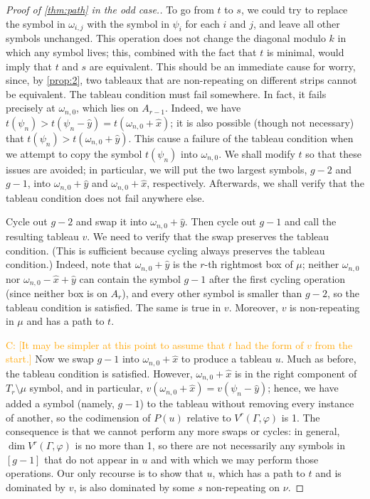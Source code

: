 \documentclass[11pt,reqno]{amsart}
\newcommand{\caelan}[1]{\textcolor{orange}{\sf C: [#1]}}
\theoremstyle{definition}
\theoremstyle{problem}
\theoremstyle{plain}
\theoremstyle{remark}
\theoremstyle{theorem}
\numberwithin{equation}{section}
\numberwithin{figure}{section}
\begin{document}
\begin{proof}[Proof of \cref{thm:path} in the odd case.]
  To go from $t$ to $s$, we could try to replace the symbol in
  $\omega_{i,j}$ with the symbol in $\psi_i$ for each $i$ and $j$, and
  leave all other symbols unchanged.  This operation does not change
  the diagonal modulo $k$ in which any symbol lives; this, combined
  with the fact that $t$ is minimal, would imply that $t$ and $s$ are
  equivalent.  This should be an immediate cause for worry, since, by
  \cref{prop:2}, two tableaux that are non-repeating on different
  strips cannot be equivalent.  The tableau condition must fail
  somewhere.  In fact, it fails precisely at $\omega_{n,0}$, which
  lies on $A_{r-1}$.  Indeed, we have
  $t(\psi_n) > t(\psi_n - \hat y) = t(\omega_{n,0}+ \hat x)$; it is
  also possible (though not necessary) that
  $t(\psi_n) > t(\omega_{n,0} + \hat y)$.  This cause a failure of the
  tableau condition when we attempt to copy the symbol $t(\psi_n)$
  into $\omega_{n,0}$.  We shall modify $t$ so that these issues are
  avoided; in particular, we will put the two largest symbols, $g-2$
  and $g-1$, into $\omega_{n,0} + \hat y$ and $\omega_{n,0} + \hat x$,
  respectively.  Afterwards, we shall verify that the tableau
  condition does not fail anywhere else.

  Cycle out $g-2$ and swap it into $\omega_{n,0} + \hat y$.  Then
  cycle out $g-1$ and call the resulting tableau $v$.  We need to
  verify that the swap preserves the tableau condition.  (This is
  sufficient because cycling always preserves the tableau condition.)
  Indeed, note that $\omega_{n,0} + \hat y$ is the $r$-th rightmost
  box of $\mu$; neither $\omega_{n,0}$ nor
  $\omega_{n,0} - \hat x + \hat y$ can contain the symbol $g-1$ after
  the first cycling operation (since neither box is on $A_r$), and
  every other symbol is smaller than $g-2$, so the tableau condition
  is satisfied.  The same is true in $v$.  Moreover, $v$ is
  non-repeating in $\mu$ and has a path to $t$.

  \caelan{It may be simpler at this point to assume that $t$ had the
    form of $v$ from the start.}  Now we swap $g-1$ into
  $\omega_{n,0} + \hat x$ to produce a tableau $u$.  Much as before,
  the tableau condition is satisfied.  However,
  $\omega_{n,0} + \hat x$ is in the right component of
  $T_r \setminus \mu$ symbol, and in particular,
  $v(\omega_{n,0} + \hat x) = v(\psi_n - \hat y)$; hence, we have
  added a symbol (namely, $g-1$) to the tableau without removing every
  instance of another, so the codimension of $P(u)$ relative to
  $V^r(\Gamma,\varphi)$ is 1.  The consequence is that we cannot
  perform any more swaps or cycles: in general,
  $\dim V^r(\Gamma,\varphi)$ is no more than 1, so there are not
  necessarily any symbols in $[g-1]$ that do not appear in $u$ and
  with which we may perform those operations.  Our only recourse is to
  show that $u$, which has a path to $t$ and is dominated by
  $v$, is also dominated by some $s$ non-repeating on $\nu$.


\end{proof}
\end{document}
